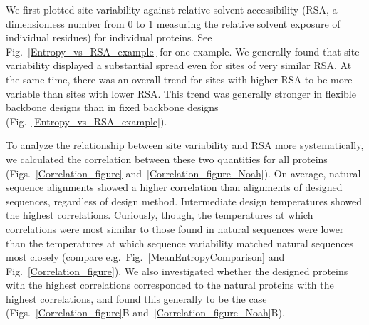\documentclass[12pt]{article}
\begin{document}
We first plotted site variability against relative solvent accessibility (RSA, a dimensionless number from 0 to 1 measuring the relative solvent exposure of individual residues) for individual proteins. See Fig.~\ref{Entropy_vs_RSA_example} for one example. We generally found that site variability displayed a substantial spread even for sites of very similar RSA. At the same time, there was an overall trend for sites with higher RSA to be more variable than sites with lower RSA. This trend was generally stronger in flexible backbone designs than in fixed backbone designs (Fig.~\ref{Entropy_vs_RSA_example}).

To analyze the relationship between site variability and RSA more systematically, we calculated the correlation between these two quantities for all proteins (Figs.~\ref{Correlation_figure} and~\ref{Correlation_figure_Noah}). On average, natural sequence alignments showed a higher correlation than alignments of designed sequences, regardless of design method. Intermediate design temperatures showed the highest correlations. Curiously, though, the temperatures at which correlations were most similar to those found in natural sequences were lower than the temperatures at which sequence variability matched natural sequences most closely (compare e.g.\ Fig.~\ref{MeanEntropyComparison} and Fig.~\ref{Correlation_figure}). We also investigated whether the designed proteins with the highest correlations corresponded to the natural proteins with the highest correlations, and found this generally to be the case (Figs.~\ref{Correlation_figure}B and~\ref{Correlation_figure_Noah}B).
\end{document}
